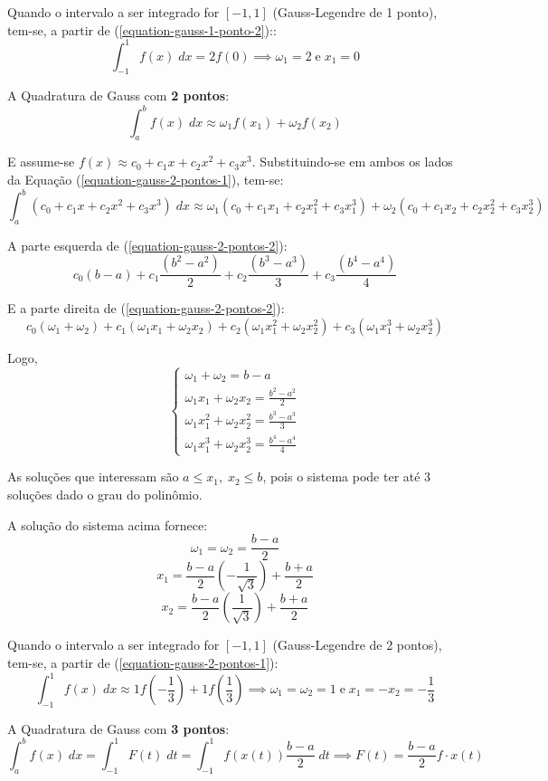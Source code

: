 Quando o intervalo a ser integrado for $[-1,1]$ (Gauss-Legendre de 1 ponto), tem-se, a partir de (\ref{equation-gauss-1-ponto-2})::
\[ \int_{-1}^1f(x)\;dx=2f(0) \implies \omega_1=2\;\text{e}\;x_1=0 \]

A Quadratura de Gauss com \textbf{2 pontos}:
\begin{equation}
	\label{equation-gauss-2-pontos-1}
	\int_{a}^b f(x)\;dx \approx \omega_1f(x_1)+\omega_2f(x_2)
\end{equation}

E assume-se $f(x)\approx c_0+c_1x+c_2x^2+c_3x^3$. Substituindo-se em ambos os lados da Equação (\ref{equation-gauss-2-pontos-1}), tem-se:
\begin{equation}
	\label{equation-gauss-2-pontos-2}
	\int_{a}^b (c_0+c_1x+c_2x^2+c_3x^3)\;dx \approx \omega_1(c_0+c_1x_1+c_2x_1^2+c_3x_1^3)+\omega_2(c_0+c_1x_2+c_2x_2^2+c_3x_2^3)
\end{equation}

A parte esquerda de (\ref{equation-gauss-2-pontos-2}):
\[ c_0(b-a)+c_1\frac{(b^2-a^2)}{2}+c_2\frac{(b^3-a^3)}{3}+c_3\frac{(b^4-a^4)}{4} \]

E a parte direita de (\ref{equation-gauss-2-pontos-2}):
\[ c_0(\omega_1+\omega_2)+c_1(\omega_1x_1+\omega_2x_2)+c_2(\omega_1x_1^2+\omega_2x_2^2)+c_3(\omega_1x_1^3+\omega_2x_2^3) \]

Logo,
\[
\begin{cases}
	\omega_1+\omega_2=b-a \\
	\omega_1x_1+\omega_2x_2=\frac{b^2-a^2}{2} \\
	\omega_1x_1^2+\omega_2x_2^2=\frac{b^3-a^3}{3} \\
	\omega_1x_1^3+\omega_2x_2^3=\frac{b^4-a^4}{4}
\end{cases}
\]

As soluções que interessam são $a\leqslant x_1,\;x_2\leqslant b$, pois o sistema pode ter até 3 soluções dado o grau do polinômio.

A solução do sistema acima fornece:
\[ \omega_1=\omega_2=\frac{b-a}{2} \]
\[ x_1=\frac{b-a}{2} \left(-\frac{1}{\sqrt{3}}\right)+\frac{b+a}{2} \]
\[ x_2=\frac{b-a}{2} \left(\frac{1}{\sqrt{3}}\right)+\frac{b+a}{2} \]

Quando o intervalo a ser integrado for $[-1,1]$ (Gauss-Legendre de 2 pontos), tem-se, a partir de (\ref{equation-gauss-2-pontos-1}):
\[ \int_{-1}^1f(x)\;dx\approx1f\left(-\frac{1}{3}\right)+1f\left(\frac{1}{3}\right) \implies \omega_1=\omega_2=1 \;\text{e}\; x_1=-x_2=-\frac{1}{3} \]

A Quadratura de Gauss com \textbf{3 pontos}:
\begin{equation}
\label{equacao-gauss-3-pontos-1}
\int_a^bf(x)\;dx=\int_{-1}^1F(t)\;dt=\int_{-1}^1f(x(t))\frac{b-a}{2}\;dt \implies F(t)=\frac{b-a}{2}f\cdot x(t)
\end{equation}


